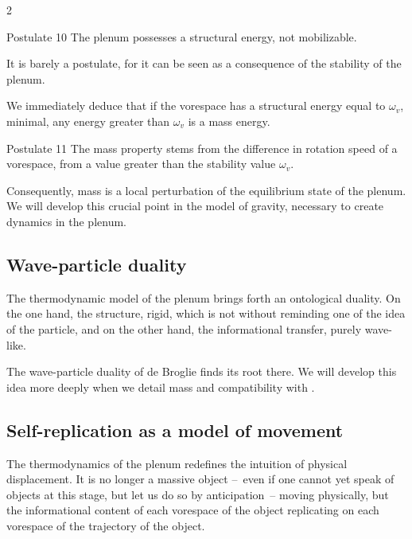 \begin{multicols}{2}
	\begin{mybox}[breakable,colback=blue!10, colbacktitle=pkcolor]{Postulate 10}
		The plenum possesses a structural energy, not mobilizable. 
	\end{mybox}
	\medskip
	
	It is barely a postulate, for it can be seen as a consequence 
	of the stability of the plenum.
	
	We immediately deduce that if the vorespace has a 
	structural energy equal to $\omega_v$, minimal, any energy greater than $\omega_v$ is 
	a mass energy.
	
	\begin{mybox}[breakable,colback=blue!10, colbacktitle=pkcolor]{Postulate 11}
		The mass property stems from the difference in rotation speed 
		of a vorespace, from a value greater than the stability value 
		$\omega_v$.
	\end{mybox}
	\medskip
	
	Consequently, mass is a local perturbation of the 
	equilibrium state of the plenum. We will develop this crucial point in the model 
	of gravity, necessary to create dynamics in the plenum.
	
	\subsection{Wave-particle duality}
	
	The thermodynamic model of the plenum brings forth an ontological 
	duality. On the one hand, the structure, rigid, which is not without 
	reminding one of the idea of the particle, and on the other hand, 
	the informational transfer, purely wave-like.
	
	The wave-particle duality of de Broglie finds its root there. We 
	will develop this idea more deeply when we detail mass and compatibility with \MQ.
	
	\subsection{Self-replication as a model of movement}
	
	The thermodynamics of the plenum redefines the intuition of physical 
	displacement. It is no longer a massive object --~even if one 
	cannot yet speak of objects at this stage, but let us do so by anticipation~-- 
	moving physically, but the informational content of 
	each vorespace of the object replicating on each vorespace of the 
	trajectory of the object.
	

\end{multicols}
